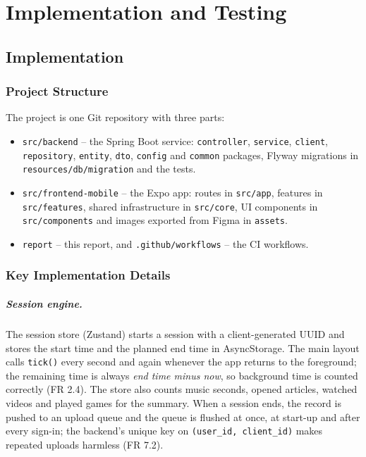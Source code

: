 \chapter{Implementation and Testing}
\label{chap:implementation-testing}

\section{Implementation}
\label{sec:implementation}

\subsection{Project Structure}
\label{sec:project-structure}

The project is one Git repository with three parts:
\begin{itemize}[leftmargin=1.8em,itemsep=2pt]
  \item \texttt{src/backend} -- the Spring Boot service: \texttt{controller},
        \texttt{service}, \texttt{client}, \texttt{repository}, \texttt{entity},
        \texttt{dto}, \texttt{config} and \texttt{common} packages, Flyway
        migrations in \texttt{resources/db/migration} and the tests.
  \item \texttt{src/frontend-mobile} -- the Expo app: routes in
        \texttt{src/app}, features in \texttt{src/features}, shared
        infrastructure in \texttt{src/core}, UI components in
        \texttt{src/components} and images exported from Figma in
        \texttt{assets}.
  \item \texttt{report} -- this report, and \texttt{.github/workflows} -- the
        CI workflows.
\end{itemize}

\subsection{Key Implementation Details}
\label{sec:key-implementation}

\paragraph{Session engine.}
The session store (Zustand) starts a session with a client-generated UUID and
stores the start time and the planned end time in AsyncStorage. The main
layout calls \texttt{tick()} every second and again whenever the app returns
to the foreground; the remaining time is always \textit{end time minus now},
so background time is counted correctly (FR 2.4). The store also counts music
seconds, opened articles, watched videos and played games for the summary.
When a session ends, the record is pushed to an upload queue and the queue is
flushed at once, at start-up and after every sign-in; the backend's unique key
on \texttt{(user\_id, client\_id)} makes repeated uploads harmless (FR 7.2).

